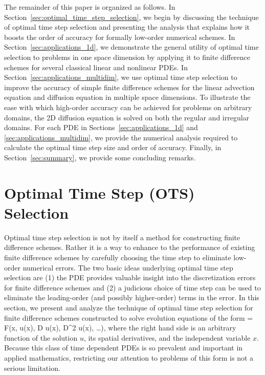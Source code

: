 \documentclass[oneeqnum,onefignum,onetabnum,onethmnum]{siamltex}
\begin{document}
The remainder of this paper is organized as follows.  
In Section~\ref{sec:optimal_time_step_selection}, we begin by 
discussing the technique of optimal time step selection and 
presenting the analysis that explains how it boosts the order of accuracy 
for formally low-order numerical schemes.  In 
Section~\ref{sec:applications_1d}, we demonstrate the general utility of 
optimal time selection to problems in one space dimension by applying it to 
finite difference schemes for several classical linear and nonlinear PDEs. 
In Section~\ref{sec:applications_multidim}, we use optimal time step selection 
to improve the accuracy of simple finite difference schemes for the linear 
advection equation and diffusion equation in multiple space dimensions.  
To illustrate the ease with which high-order accuracy can be achieved for
problems on arbitrary domains, the 2D diffusion equation is solved on both 
the regular and irregular domains.  
For each PDE in Sections~\ref{sec:applications_1d} and 
\ref{sec:applications_multidim}, we provide the numerical analysis required 
to calculate the optimal time step size and order of accuracy.  
Finally, in Section~\ref{sec:summary}, we provide some concluding remarks. 


\section{\label{sec:optimal_time_step_selection} 
         Optimal Time Step (OTS) Selection}
Optimal time step selection is not by itself a method for constructing 
finite difference schemes.  Rather it is a way to enhance to the performance
of existing finite difference schemes by carefully choosing the time step to 
eliminate low-order numerical errors.  The two basic ideas underlying 
optimal time step selection are (1) the PDE provides valuable insight into the 
discretization errors for finite difference schemes and (2) a judicious choice 
of time step can be used to eliminate the leading-order (and possibly 
higher-order) terms in the error.  In this section, we present and analyze 
the technique of optimal time step selection for finite difference schemes 
constructed to solve evolution equations of the form 
\beq
   = 
    F\left(x, u(x), D u(x), D^2 u(x), \ldots \right), 
\eeq
where the right hand side is an arbitrary function of the solution $u$, its 
spatial derivatives, and the independent variable $x$.
Because this class of time dependent PDEs is so prevalent and important in 
applied mathematics, restricting our attention to problems of this form is 
not a serious limitation.  
\end{document}
